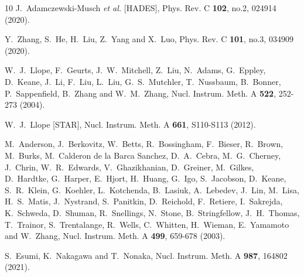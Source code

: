 \documentclass[10pt,aps,prc,twocolumn,floatfix]{revtex4-1}
\begin{document}
\begin{thebibliography}{10}
J.~Adamczewski-Musch \textit{et al.} [HADES],
Phys. Rev. C \textbf{102}, no.2, 024914 (2020).

Y.~Zhang, S.~He, H.~Liu, Z.~Yang and X.~Luo,
Phys. Rev. C \textbf{101}, no.3, 034909 (2020).

W.~J.~Llope, F.~Geurts, J.~W.~Mitchell, Z.~Liu, N.~Adams, G.~Eppley, D.~Keane, J.~Li, F.~Liu, L.~Liu, G.~S.~Mutchler, T.~Nussbaum, B.~Bonner, P.~Sappenfield, B.~Zhang and W.~M.~Zhang,
Nucl. Instrum. Meth. A \textbf{522}, 252-273 (2004).

W.~J.~Llope [STAR],
Nucl. Instrum. Meth. A \textbf{661}, S110-S113 (2012).

M.~Anderson, J.~Berkovitz, W.~Betts, R.~Bossingham, F.~Bieser, R.~Brown, M.~Burks, M.~Calderon de la Barca Sanchez, D.~A.~Cebra, M.~G.~Cherney, J.~Chrin, W.~R.~Edwards, V.~Ghazikhanian, D.~Greiner, M.~Gilkes, D.~Hardtke, G.~Harper, E.~Hjort, H.~Huang, G.~Igo, S.~Jacobson, D.~Keane, S.~R.~Klein, G.~Koehler, L.~Kotchenda, B.~Lasiuk, A.~Lebedev, J.~Lin, M.~Lisa, H.~S.~Matis, J.~Nystrand, S.~Panitkin, D.~Reichold, F.~Retiere, I.~Sakrejda, K.~Schweda, D.~Shuman, R.~Snellings, N.~Stone, B.~Stringfellow, J.~H.~Thomas, T.~Trainor, S.~Trentalange, R.~Wells, C.~Whitten, H.~Wieman, E.~Yamamoto and W.~Zhang,
Nucl. Instrum. Meth. A \textbf{499}, 659-678 (2003).

S.~Esumi, K.~Nakagawa and T.~Nonaka,
Nucl. Instrum. Meth. A \textbf{987}, 164802 (2021).


\end{thebibliography}
\end{document}
